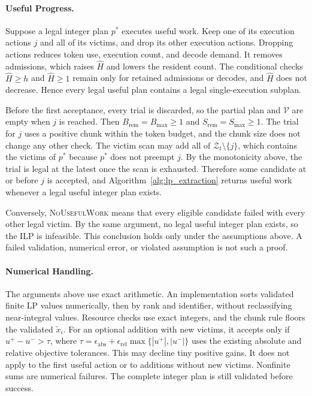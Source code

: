 \documentclass[11pt]{article}
\begin{document}
\paragraph{Useful Progress.}
Suppose a legal integer plan \(p^*\) executes useful work. Keep one of its execution actions \(j\) and all of its victims, and drop its other execution actions. Dropping actions reduces token use, execution count, and decode demand. It removes admissions, which raises \(\hat H\) and lowers the resident count. The conditional checks \(\hat H\ge h\) and \(\hat H\ge1\) remain only for retained admissions or decodes, and \(\hat H\) does not decrease. Hence every legal useful plan contains a legal single-execution subplan.

Before the first acceptance, every trial is discarded, so the partial plan and \(\mathcal{V}\) are empty when \(j\) is reached. Then \(B_{\mathrm{rem}}=B_{\max}\ge1\) and \(S_{\mathrm{rem}}=S_{\max}\ge1\). The trial for \(j\) uses a positive chunk within the token budget, and the chunk size does not change any other check. The victim scan may add all of \(\mathcal{Z}_t\setminus\{j\}\), which contains the victims of \(p^*\) because \(p^*\) does not preempt \(j\). By the monotonicity above, the trial is legal at the latest once the scan is exhausted. Therefore some candidate at or before \(j\) is accepted, and Algorithm~\ref{alg:lp_extraction} returns useful work whenever a legal useful integer plan exists.

Conversely, \textsc{NoUsefulWork} means that every eligible candidate failed with every other legal victim. By the same argument, no legal useful integer plan exists, so the ILP is infeasible. This conclusion holds only under the assumptions above. A failed validation, numerical error, or violated assumption is not such a proof.

\paragraph{Numerical Handling.}
The arguments above use exact arithmetic. An implementation sorts validated finite LP values numerically, then by rank and identifier, without reclassifying near-integral values. Resource checks use exact integers, and the chunk rule floors the validated \(\tilde x_i\). For an optional addition with new victims, it accepts only if \(u^+-u^->\tau\), where \(\tau=\epsilon_{\mathrm{abs}}+\epsilon_{\mathrm{rel}}\max\{|u^+|,|u^-|\}\) uses the existing absolute and relative objective tolerances. This may decline tiny positive gains. It does not apply to the first useful action or to additions without new victims. Nonfinite sums are numerical failures. The complete integer plan is still validated before success.
\end{document}
